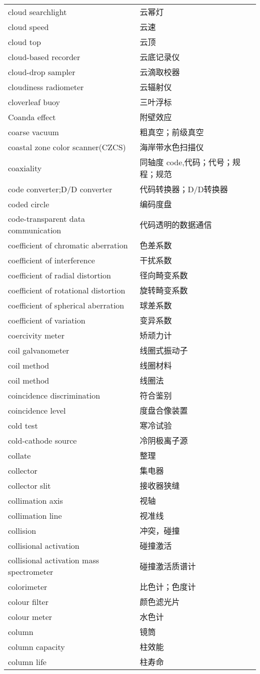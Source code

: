 \documentclass[
]{article}
\begin{document}
\begin{longtable}[]{@{}ll@{}}
cloud searchlight & 云幂灯 \\
cloud speed & 云速 \\
cloud top & 云顶 \\
cloud-based recorder & 云底记录仪 \\
cloud-drop sampler & 云滴取校器 \\
cloudiness radiometer & 云辐射仪 \\
cloverleaf buoy & 三叶浮标 \\
Coanda effect & 附壁效应 \\
coarse vacuum & 粗真空；前级真空 \\
coastal zone color scanner(CZCS) & 海岸带水色扫描仪 \\
coaxiality & 同轴度 code,代码；代号；规程；规范 \\
code converter;D/D converter & 代码转换器；D/D转换器 \\
coded circle & 编码度盘 \\
code-transparent data communication & 代码透明的数据通信 \\
coefficient of chromatic aberration & 色差系数 \\
coefficient of interference & 干扰系数 \\
coefficient of radial distortion & 径向畸变系数 \\
coefficient of rotational distortion & 旋转畸变系数 \\
coefficient of spherical aberration & 球差系数 \\
coefficient of variation & 变异系数 \\
coercivity meter & 矫顽力计 \\
coil galvanometer & 线圈式振动子 \\
coil method & 线圈材料 \\
coil method & 线圈法 \\
coincidence discrimination & 符合鉴别 \\
coincidence level & 度盘合像装置 \\
cold test & 寒冷试验 \\
cold-cathode source & 冷阴极离子源 \\
collate & 整理 \\
collector & 集电器 \\
collector slit & 接收器狭缝 \\
collimation axis & 视轴 \\
collimation line & 视准线 \\
collision & 冲突，碰撞 \\
collisional activation & 碰撞激活 \\
collisional activation mass spectrometer & 碰撞激活质谱计 \\
colorimeter & 比色计；色度计 \\
colour filter & 颜色滤光片 \\
colour meter & 水色计 \\
column & 镜筒 \\
column capacity & 柱效能 \\
column life & 柱寿命 \\
\bottomrule()
\end{longtable}
\end{document}
